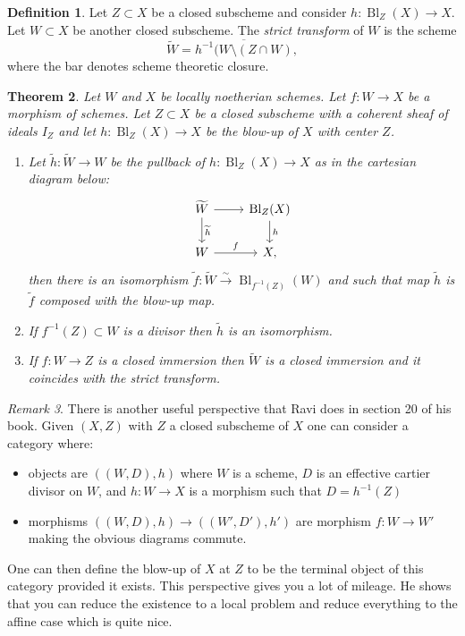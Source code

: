 \documentclass[12pt]{article}
\numberwithin{equation}{section}
\newtheorem{theorem}{Theorem}[subsection]
\theoremstyle{definition}
\newtheorem{definition}[theorem]{Definition}
\theoremstyle{remark}
\newtheorem{remark}[theorem]{Remark}
\newcommand{\Bl}{\operatorname{Bl}}
\begin{document}
\begin{definition}
	Let $Z \subset X$ be a closed subscheme and consider $h:\Bl_Z(X)\to X$.
	Let $W \subset X$ be another closed subscheme. 
	The \emph{strict transform} of $W$ is the scheme 
	 $$ \widetilde{W} = \overline{ h^{-1}(W\setminus (Z\cap W)}, $$
    where the bar denotes scheme theoretic closure. 
\end{definition}

\begin{theorem}
	Let $W$ and $X$ be locally noetherian schemes. 
	Let $f:W \to X$ be a morphism of schemes. 
	Let $Z \subset X$ be a closed subscheme with a coherent sheaf of ideals $I_Z$ and let $h: \Bl_Z(X) \to X$ be the blow-up of $X$ with center $Z$.
	\begin{enumerate}
		\item Let $\widetilde{h}:\widetilde{W} \to W$ be the pullback of $h:\Bl_Z(X)\to X$ as in the cartesian diagram below:
		 $$\begin{tikzcd}
		\widetilde{W} \ar[r] \ar[d,"\widetilde{h}"] & \Bl_Z(X) \ar[d,"h"] \\
		W \ar[r,"f"] & X,
		 \end{tikzcd}
		 $$
		then there is an isomorphism $\widetilde{f} \colon \widetilde{W} \xrightarrow{\sim}\Bl_{f^{-1}(Z)}(W)$ and such that map $\widetilde{h}$ is $\widetilde{f}$ composed with the blow-up map.
		\item If $f^{-1}(Z)\subset W$ is a divisor then $\widetilde{h}$ is an isomorphism.
		\item If $f:W \to Z$ is a closed immersion then $\widetilde{W}$ is a closed immersion and it coincides with the strict transform.
	\end{enumerate}
\end{theorem}

\begin{remark}
There is another useful perspective that Ravi does in section 20 of his book. 
Given $(X,Z)$ with $Z$ a closed subscheme of $X$ one can consider a category where:
\begin{itemize}
	\item objects are $((W,D),h)$ where $W$ is a scheme, $D$ is an effective cartier divisor on $W$, and $h:W\to X$ is a morphism such that $D =h^{-1}(Z)$
	\item morphisms $((W,D),h) \to ( (W',D'),h')$ are morphism $f:W \to W'$ making the obvious diagrams commute. 
\end{itemize}

One can then define the blow-up of $X$ at $Z$ to be the terminal object of this category provided it exists. 
This perspective gives you a lot of mileage. 
He shows that you can reduce the existence to a local problem and reduce everything to the affine case which is quite nice.
\end{remark}
\end{document}
